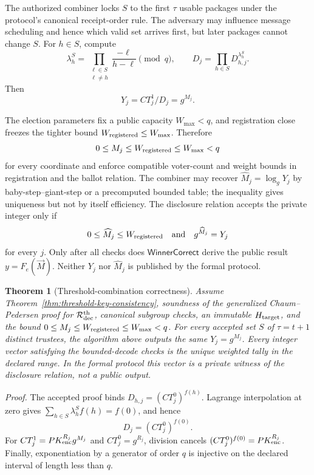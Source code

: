 \documentclass[pdflatex,sn-mathphys-num]{sn-jnl}%
\theoremstyle{thmstyleone}%
\newtheorem{theorem}{Theorem}%
\theoremstyle{thmstyletwo}%
\theoremstyle{thmstylethree}%
\begin{document}
The authorized combiner locks $S$ to the first $\tau$ usable packages under
the protocol's canonical receipt-order rule.  The adversary may influence
message scheduling and hence which valid set arrives first, but later packages
cannot change $S$.  For $h\in S$, compute
\[
 \lambda_h^S=\prod_{\substack{\ell\in S\\\ell\neq h}}
              \frac{-\ell}{h-\ell}\pmod q,
 \qquad
 D_j=\prod_{h\in S}D_{h,j}^{\lambda_h^S}.
\]
Then
\[
 Y_j=CT_j^1/D_j=g^{M_j}.
\]

The election parameters fix a public capacity $W_{\max}<q$, and registration
close freezes the tighter bound $W_{\rm registered}\leq W_{\max}$.  Therefore
\[
 0\leq M_j\leq W_{\rm registered}\leq W_{\max}<q
\]
for every coordinate and enforce compatible voter-count and weight bounds in
registration and the ballot relation.  The combiner may recover
$\widehat M_j=\log_gY_j$ by baby-step--giant-step or a precomputed bounded
table; the inequality gives uniqueness but not by itself efficiency.  The
disclosure relation accepts the private integer only if
\[
 0\leq\widehat M_j\leq W_{\rm registered}
 \quad\text{and}\quad
 g^{\widehat M_j}=Y_j
\]
for every $j$.  Only after all checks does
$\mathsf{WinnerCorrect}$ derive the public result $y=F_e(\vec M)$.  Neither
$Y_j$ nor $\widehat M_j$ is published by the formal protocol.

\begin{theorem}[Threshold-combination correctness]
\label{thm:threshold-tally}
Assume Theorem~\ref{thm:threshold-key-consistency}, soundness of the
generalized Chaum--Pedersen proof for $\mathcal R_{\rm dec}^{\rm th}$,
canonical subgroup checks, an immutable $H_{\rm target}$, and the bound
$0\leq M_j\leq W_{\rm registered}\leq W_{\max}<q$.  For every accepted set $S$ of $\tau=t+1$
distinct trustees, the algorithm above outputs the same
$Y_j=g^{M_j}$.  Every integer vector satisfying the bounded-decode checks is
the unique weighted tally in the declared range.  In the formal protocol this
vector is a private witness of the disclosure relation, not a public output.
\end{theorem}

\textit{Proof.} The accepted proof binds
$D_{h,j}=(CT_j^0)^{f(h)}$.  Lagrange interpolation at zero gives
$\sum_{h\in S}\lambda_h^Sf(h)=f(0)$, and hence
\[
 D_j=(CT_j^0)^{f(0)}.
\]
For $CT_j^1=PK_{\rm enc}^{R_j}g^{M_j}$ and
$CT_j^0=g^{R_j}$, division cancels
$(CT_j^0)^{f(0)}=PK_{\rm enc}^{R_j}$.  Finally, exponentiation by a generator
of order $q$ is injective on the declared interval of length less than $q$.
\end{document}
